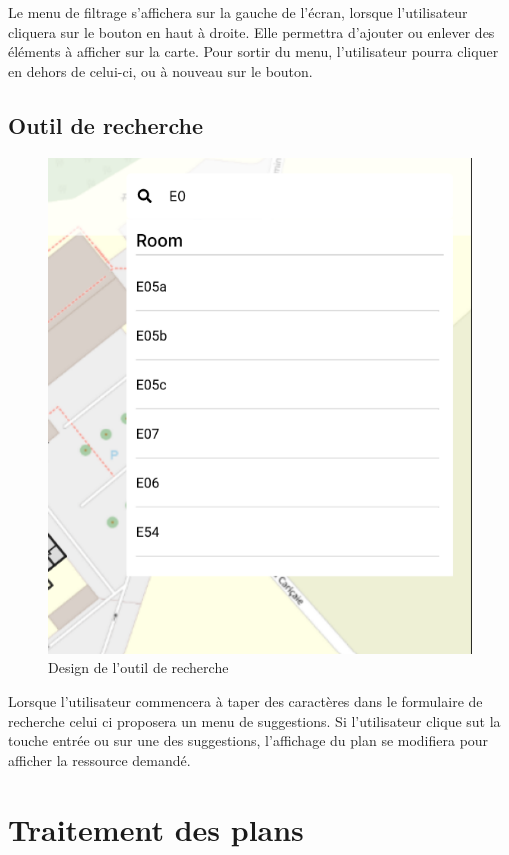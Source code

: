 \documentclass[
    iai, %
    il, %
]{heig-tb}
\begin{document}
Le menu de filtrage s'affichera sur la gauche de l'écran, lorsque l'utilisateur cliquera sur le bouton en haut à droite.
Elle permettra d'ajouter ou enlever des éléments à afficher sur la carte.
Pour sortir du menu, l'utilisateur pourra cliquer en dehors de celui-ci, ou à nouveau sur le bouton.

\section{Outil de recherche}

\begin{figure}[H]
    \caption{Design de l'outil de recherche}
    \centering
    \includegraphics[scale=0.5]{designRecherche.png}
\end{figure}

Lorsque l'utilisateur commencera à taper des caractères dans le formulaire de recherche celui ci proposera un menu de suggestions.
Si l'utilisateur clique sut la touche entrée ou sur une des suggestions, l'affichage du plan se modifiera pour afficher la ressource demandé.

\chapter{Traitement des plans}
\end{document}

